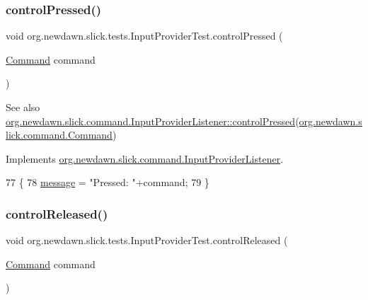\subsubsection{\texorpdfstring{control\+Pressed()}{controlPressed()}}
{\footnotesize\ttfamily void org.\+newdawn.\+slick.\+tests.\+Input\+Provider\+Test.\+control\+Pressed (\begin{DoxyParamCaption}\item[{\mbox{\hyperlink{interfaceorg_1_1newdawn_1_1slick_1_1command_1_1_command}{Command}}}]{command }\end{DoxyParamCaption})\hspace{0.3cm}{\ttfamily [inline]}}

\begin{DoxySeeAlso}{See also}
\mbox{\hyperlink{interfaceorg_1_1newdawn_1_1slick_1_1command_1_1_input_provider_listener_a6c01290edae31f20d1577ffa7e0c3907}{org.\+newdawn.\+slick.\+command.\+Input\+Provider\+Listener\+::control\+Pressed}}(\mbox{\hyperlink{interfaceorg_1_1newdawn_1_1slick_1_1command_1_1_command}{org.\+newdawn.\+slick.\+command.\+Command}}) 
\end{DoxySeeAlso}


Implements \mbox{\hyperlink{interfaceorg_1_1newdawn_1_1slick_1_1command_1_1_input_provider_listener_a6c01290edae31f20d1577ffa7e0c3907}{org.\+newdawn.\+slick.\+command.\+Input\+Provider\+Listener}}.


\begin{DoxyCode}
77                                                 \{
78         \mbox{\hyperlink{classorg_1_1newdawn_1_1slick_1_1tests_1_1_input_provider_test_a730fb6709b68daac2561204c3ab0e7fc}{message}} = \textcolor{stringliteral}{"Pressed: "}+command;
79     \}
\end{DoxyCode}
\mbox{\label{classorg_1_1newdawn_1_1slick_1_1tests_1_1_input_provider_test_a68bf86e0de9df06f1a129faa2337a662}} 
\subsubsection{\texorpdfstring{control\+Released()}{controlReleased()}}
{\footnotesize\ttfamily void org.\+newdawn.\+slick.\+tests.\+Input\+Provider\+Test.\+control\+Released (\begin{DoxyParamCaption}\item[{\mbox{\hyperlink{interfaceorg_1_1newdawn_1_1slick_1_1command_1_1_command}{Command}}}]{command }\end{DoxyParamCaption})\hspace{0.3cm}{\ttfamily [inline]}}

